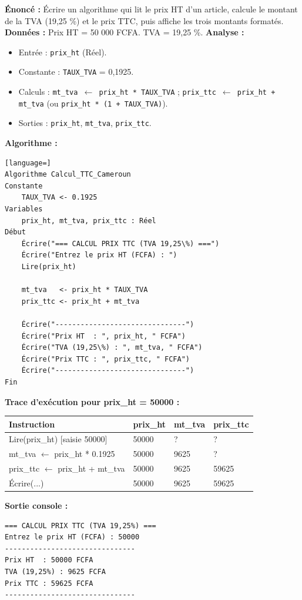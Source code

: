 \documentclass[11pt]{article}
\begin{document}
\begin{exoresolu}
\textbf{Énoncé :} Écrire un algorithme qui lit le prix HT d'un article, calcule le montant de la TVA (19,25 \%) et le prix TTC, puis affiche les trois montants formatés.
\textbf{Données :} Prix HT = 50 000 FCFA. TVA = 19,25 \%.
\textbf{Analyse :}
\begin{itemize}
    \item Entrée : \texttt{prix\_ht} (Réel).
    \item Constante : \texttt{TAUX\_TVA} = 0,1925.
    \item Calculs : \texttt{mt\_tva $\leftarrow$ prix\_ht * TAUX\_TVA} ; \texttt{prix\_ttc $\leftarrow$ prix\_ht + mt\_tva} (ou \texttt{prix\_ht * (1 + TAUX\_TVA)}).
    \item Sorties : \texttt{prix\_ht}, \texttt{mt\_tva}, \texttt{prix\_ttc}.
\end{itemize}

\tcblower

\textbf{Algorithme :}
\begin{lstlisting}[language=]
Algorithme Calcul_TTC_Cameroun
Constante
    TAUX_TVA <- 0.1925
Variables
    prix_ht, mt_tva, prix_ttc : Réel
Début
    Écrire("=== CALCUL PRIX TTC (TVA 19,25\%) ===")
    Écrire("Entrez le prix HT (FCFA) : ")
    Lire(prix_ht)
    
    mt_tva   <- prix_ht * TAUX_TVA
    prix_ttc <- prix_ht + mt_tva
    
    Écrire("-------------------------------")
    Écrire("Prix HT  : ", prix_ht, " FCFA")
    Écrire("TVA (19,25\%) : ", mt_tva, " FCFA")
    Écrire("Prix TTC : ", prix_ttc, " FCFA")
    Écrire("-------------------------------")
Fin
\end{lstlisting}

\textbf{Trace d'exécution pour prix\_ht = 50000 :}

\begin{center}
\begin{tabularx}{\linewidth}{|l|X|X|X|}\hline
\rowcolor{popblue}\textbf{Instruction} & \textbf{prix\_ht} & \textbf{mt\_tva} & \textbf{prix\_ttc} \\\hline
Lire(prix\_ht) [saisie 50000] & 50000 & ? & ? \\\hline
mt\_tva $\leftarrow$ prix\_ht * 0.1925 & 50000 & 9625 & ? \\\hline
prix\_ttc $\leftarrow$ prix\_ht + mt\_tva & 50000 & 9625 & 59625 \\\hline
Écrire(...) & 50000 & 9625 & 59625 \\\hline
\end{tabularx}
\end{center}

\textbf{Sortie console :}
\begin{lstlisting}
=== CALCUL PRIX TTC (TVA 19,25%) ===
Entrez le prix HT (FCFA) : 50000
-------------------------------
Prix HT  : 50000 FCFA
TVA (19,25%) : 9625 FCFA
Prix TTC : 59625 FCFA
-------------------------------
\end{lstlisting}
\end{exoresolu}
\end{document}

